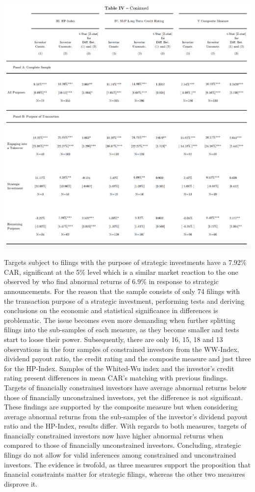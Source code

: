 \documentclass[12pt]{article}
\begin{document}
\begin{table}[!htb]
	\centering
	\begin{adjustbox}{width=\textwidth}
		\includegraphics{ar_measure2_final}
	\end{adjustbox}
\end{table}
Targets subject to filings with the purpose of strategic investments have a 7.92\% CAR, significant at the 5\% level which is a similar market reaction to the one observed by \citet[p.]{Allen2000} who find abnormal returns of 6.9\% in response to strategic announcements. For the reason that the sample consists of only 74 filings with the transaction purpose of a strategic investment, performing tests and deriving conclusions on the economic and statistical significance in differences is problematic. The issue becomes even more demanding when  further splitting filings into the sub-samples of each measure, as they become smaller and tests start to loose their power. Subsequently, there are only 16, 15, 18 and 13 observations in the four samples of constrained investors from the WW-Index, dividend payout ratio, the credit rating and the composite measure and just three for the HP-Index. Samples of the Whited-Wu index and the investor's credit rating present differences in mean CAR's matching with previous findings. Targets of financially constrained investors have average abnormal returns below those of financially unconstrained investors, yet the difference is not significant. These findings are supported by the composite measure but when considering average abnormal returns from the sub-samples of the investor's dividend payout ratio and the HP-Index, results differ. With regards to both measures, targets of financially constrained investors now have higher abnormal returns when compared to those of financially unconstrained investors. Concluding, strategic filings do not allow for valid inferences among constrained and unconstrained investors. The evidence is twofold, as three measures support the proposition that financial constraints matter for strategic filings, whereas the other two measures disprove it.\par
\end{document}
